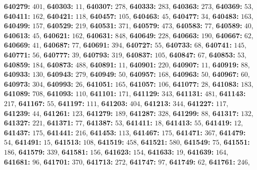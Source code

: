 \textsf{\bfseries 640279:} $401$, \textsf{\bfseries 640303:} $11$, \textsf{\bfseries 640307:} $278$, \textsf{\bfseries 640333:} $283$, \textsf{\bfseries 640363:} $273$, \textsf{\bfseries 640369:} $53$, \textsf{\bfseries 640411:} $162$, \textsf{\bfseries 640421:} $118$, \textsf{\bfseries 640457:} $105$, \textsf{\bfseries 640463:} $45$, \textsf{\bfseries 640477:} $34$, \textsf{\bfseries 640483:} $163$, \textsf{\bfseries 640499:} $157$, \textsf{\bfseries 640529:} $219$, \textsf{\bfseries 640531:} $371$, \textsf{\bfseries 640579:} $473$, \textsf{\bfseries 640583:} $77$, \textsf{\bfseries 640589:} $40$, \textsf{\bfseries 640613:} $45$, \textsf{\bfseries 640621:} $162$, \textsf{\bfseries 640631:} $848$, \textsf{\bfseries 640649:} $228$, \textsf{\bfseries 640663:} $190$, \textsf{\bfseries 640667:} $62$, \textsf{\bfseries 640669:} $41$, \textsf{\bfseries 640687:} $77$, \textsf{\bfseries 640691:} $394$, \textsf{\bfseries 640727:} $55$, \textsf{\bfseries 640733:} $68$, \textsf{\bfseries 640741:} $145$, \textsf{\bfseries 640771:} $56$, \textsf{\bfseries 640777:} $39$, \textsf{\bfseries 640793:} $319$, \textsf{\bfseries 640837:} $105$, \textsf{\bfseries 640847:} $67$, \textsf{\bfseries 640853:} $53$, \textsf{\bfseries 640859:} $184$, \textsf{\bfseries 640873:} $488$, \textsf{\bfseries 640891:} $11$, \textsf{\bfseries 640901:} $220$, \textsf{\bfseries 640907:} $11$, \textsf{\bfseries 640919:} $88$, \textsf{\bfseries 640933:} $130$, \textsf{\bfseries 640943:} $279$, \textsf{\bfseries 640949:} $50$, \textsf{\bfseries 640957:} $168$, \textsf{\bfseries 640963:} $50$, \textsf{\bfseries 640967:} $60$, \textsf{\bfseries 640973:} $304$, \textsf{\bfseries 640993:} $26$, \textsf{\bfseries 641051:} $165$, \textsf{\bfseries 641057:} $106$, \textsf{\bfseries 641077:} $28$, \textsf{\bfseries 641083:} $183$, \textsf{\bfseries 641089:} $708$, \textsf{\bfseries 641093:} $110$, \textsf{\bfseries 641101:} $171$, \textsf{\bfseries 641129:} $343$, \textsf{\bfseries 641131:} $481$, \textsf{\bfseries 641143:} $217$, \textsf{\bfseries 641167:} $55$, \textsf{\bfseries 641197:} $111$, \textsf{\bfseries 641203:} $404$, \textsf{\bfseries 641213:} $344$, \textsf{\bfseries 641227:} $117$, \textsf{\bfseries 641239:} $44$, \textsf{\bfseries 641261:} $123$, \textsf{\bfseries 641279:} $189$, \textsf{\bfseries 641287:} $328$, \textsf{\bfseries 641299:} $88$, \textsf{\bfseries 641317:} $132$, \textsf{\bfseries 641327:} $221$, \textsf{\bfseries 641371:} $77$, \textsf{\bfseries 641387:} $53$, \textsf{\bfseries 641411:} $18$, \textsf{\bfseries 641413:} $55$, \textsf{\bfseries 641419:} $12$, \textsf{\bfseries 641437:} $175$, \textsf{\bfseries 641441:} $216$, \textsf{\bfseries 641453:} $113$, \textsf{\bfseries 641467:} $175$, \textsf{\bfseries 641471:} $367$, \textsf{\bfseries 641479:} $54$, \textsf{\bfseries 641491:} $15$, \textsf{\bfseries 641513:} $108$, \textsf{\bfseries 641519:} $458$, \textsf{\bfseries 641521:} $580$, \textsf{\bfseries 641549:} $75$, \textsf{\bfseries 641551:} $186$, \textsf{\bfseries 641579:} $339$, \textsf{\bfseries 641581:} $156$, \textsf{\bfseries 641623:} $154$, \textsf{\bfseries 641633:} $19$, \textsf{\bfseries 641639:} $164$, \textsf{\bfseries 641681:} $96$, \textsf{\bfseries 641701:} $370$, \textsf{\bfseries 641713:} $272$, \textsf{\bfseries 641747:} $97$, \textsf{\bfseries 641749:} $62$, \textsf{\bfseries 641761:} $246$, 
